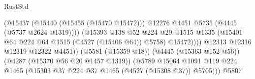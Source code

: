\begin{lexlean}{RustStd}
\begin{coremodule}
{\begin{coremodule}
{{{{{{{{{{{{{{{{{{{{{{{{{{{{{{{{{{{{{{                                                        (@15437
                                                          (@15440 (@15455 (@15470 @15472)))
                                                          @12276
                                                          @4451
                                                          @5735
                                                          (@4445 (@5737 @2624 @1319))))
                                                      (@15393
                                                        @138
                                                        @52
                                                        @224
                                                        @29
                                                        @1515
                                                        @1335
                                                        (@15401
                                                          @64
                                                          @224
                                                          @64
                                                          @1515
                                                          (@4527 (@15406 @64))
                                                          @5758)
                                                        @15472))))
                                                @12313
                                                @12316
                                                @12319
                                                @12322
                                                @4451))
                                            (@5581 (@15359 @18))
                                            (@4445 (@15363 @152 @56))
                                            (@4287 (@15370 @56 @20 @1457 @1319))
                                            (@5789
                                              @15064
                                              @1091
                                              @119
                                              @224
                                              @1465
                                              (@15303
                                                @37
                                                @224
                                                @37
                                                @1465
                                                (@4527 (@15308 @37))
                                                @5705)))
                                          @5807
}}}}}}}}}}}}}}}}}}}}}}}}}}}}}}}}}}}}}}
\end{coremodule}}
\end{coremodule}
\end{lexlean}
